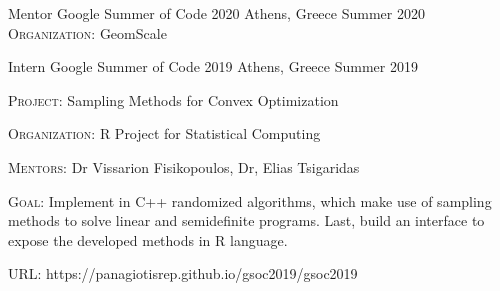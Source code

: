 

\begin{cventries}

\cventry
{Mentor} %
{Google Summer of Code 2020} %
{Athens, Greece} %
{Summer 2020} %
{
{\fontsize{8pt}{1em}\bodyfont\scshape Organization}: GeomScale
}

  \cventry
    {Intern} %
    {Google Summer of Code 2019} %
    {Athens, Greece} %
    {Summer 2019} %
    {
      \begin{cvitems} %
        \item {{\fontsize{8pt}{1em}\bodyfont\scshape Project}: Sampling Methods for Convex Optimization}
        \item {{\fontsize{8pt}{1em}\bodyfont\scshape Organization}: R Project for Statistical Computing}
        \item {{\fontsize{8pt}{1em}\bodyfont\scshape Mentors}: Dr Vissarion Fisikopoulos, Dr, Elias Tsigaridas}
        \item {{\fontsize{8pt}{1em}\bodyfont\scshape Goal}: Implement in C++ randomized algorithms, which make use of sampling methods to solve linear and semidefinite programs. Last, build an interface to expose the developed methods in R language.}
        \item {{\fontsize{8pt}{1em}\bodyfont\scshape URL}: https://panagiotisrep.github.io/gsoc2019/gsoc2019}
      \end{cvitems}
    }


\end{cventries}
